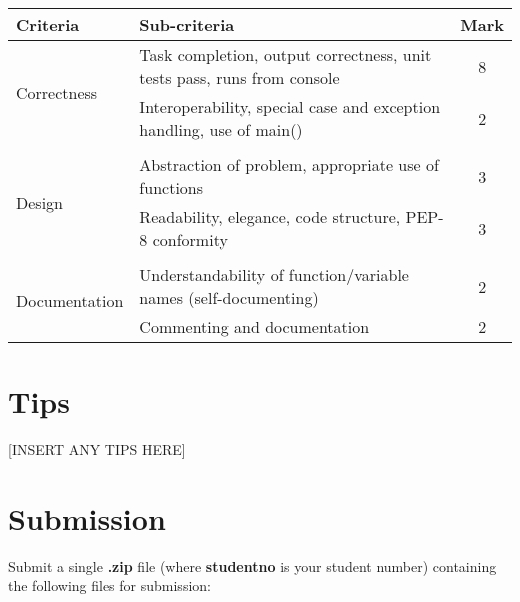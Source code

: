 \documentclass[10pt,a4paper]{article}
\begin{document}
\begin{center}
\begin{tabular}{  l | l | c  }
\toprule
\textbf{Criteria} & \textbf{Sub-criteria} & \textbf{Mark}\\
\midrule
\multirow{2}{*}{Correctness} & Task completion, output correctness, unit tests pass, runs from console & 8\\
  & Interoperability, special case and exception handling, use of main() & 2 \\
\\
\multirow{2}{*}{Design} & Abstraction of problem, appropriate use of functions & 3\\
 & Readability, elegance, code structure, PEP-8 conformity & 3\\
\\
\multirow{2}{*}{Documentation} & Understandability of function/variable names (self-documenting) & 2\\
 & Commenting and documentation & 2\\
\bottomrule
\end{tabular}
\end{center}


\section{Tips}
[INSERT ANY TIPS HERE]

\section{Submission}
\label{sec:submission}
Submit a single \textbf{.zip} file (where \textbf{studentno} is your student number) containing the following files for submission:\\
\end{document}
